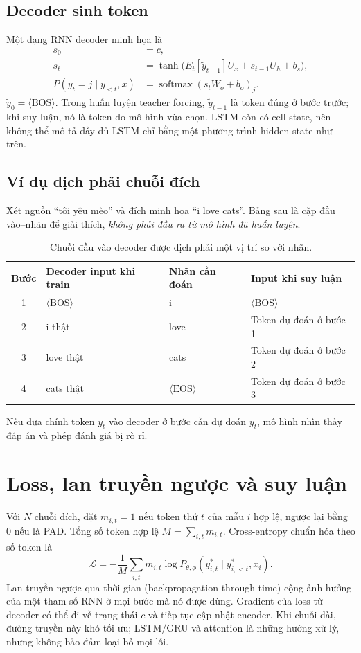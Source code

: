 \documentclass[12pt,a4paper]{article}
\begin{document}
\subsection{Decoder sinh token}
Một dạng RNN decoder minh họa là
\begin{align}
s_0&=c,\\
s_t&=\tanh\bigl(E_t[\tilde y_{t-1}]U_x+s_{t-1}U_h+b_s\bigr),\\
P(y_t=j\mid y_{<t},x)&=\operatorname{softmax}(s_tW_o+b_o)_j.
\end{align}
$\tilde y_0=\langle\mathrm{BOS}\rangle$. Trong huấn luyện teacher forcing, $\tilde y_{t-1}$ là token đúng ở bước trước; khi suy luận, nó là token do mô hình vừa chọn. LSTM còn có cell state, nên không thể mô tả đầy đủ LSTM chỉ bằng một phương trình hidden state như trên.

\subsection{Ví dụ dịch phải chuỗi đích}
Xét nguồn ``tôi yêu mèo'' và đích minh họa ``i love cats''. Bảng sau là cặp đầu vào--nhãn để giải thích, \emph{không phải đầu ra từ mô hình đã huấn luyện}.
\begin{table}[ht]
\centering\small
\begin{tabular}{clll}\toprule
Bước & Decoder input khi train & Nhãn cần đoán & Input khi suy luận\\\midrule
1 & $\langle\mathrm{BOS}\rangle$ & i & $\langle\mathrm{BOS}\rangle$\\
2 & i thật & love & Token dự đoán ở bước 1\\
3 & love thật & cats & Token dự đoán ở bước 2\\
4 & cats thật & $\langle\mathrm{EOS}\rangle$ & Token dự đoán ở bước 3\\\bottomrule
\end{tabular}
\caption{Chuỗi đầu vào decoder được dịch phải một vị trí so với nhãn.}
\end{table}
Nếu đưa chính token $y_t$ vào decoder ở bước cần dự đoán $y_t$, mô hình nhìn thấy đáp án và phép đánh giá bị rò rỉ.

\section{Loss, lan truyền ngược và suy luận}
Với $N$ chuỗi đích, đặt $m_{i,t}=1$ nếu token thứ $t$ của mẫu $i$ hợp lệ, ngược lại bằng $0$ nếu là PAD. Tổng số token hợp lệ $M=\sum_{i,t}m_{i,t}$. Cross-entropy chuẩn hóa theo số token là
\begin{equation}
\mathcal L=-\frac1M\sum_{i,t}m_{i,t}\log P_{\theta,\phi}(y^*_{i,t}\mid y^*_{i,<t},x_i).
\end{equation}
Lan truyền ngược qua thời gian (backpropagation through time) cộng ảnh hưởng của một tham số RNN ở mọi bước mà nó được dùng. Gradient của loss từ decoder có thể đi về trạng thái $c$ và tiếp tục cập nhật encoder. Khi chuỗi dài, đường truyền này khó tối ưu; LSTM/GRU và attention là những hướng xử lý, nhưng không bảo đảm loại bỏ mọi lỗi.
\end{document}

